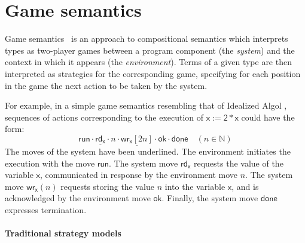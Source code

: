 \documentclass[draft,11pt]{report}
\newcommand{\kw}[1]{\ensuremath{ \mathsf{#1} }}
\begin{document}
%
%



\section{Game semantics} %



Game semantics~\cite{gsll,pcfajm,pcfho} is an approach to
compositional semantics which interprets types as two-player games
between a program component (the \emph{system}) and the context in
which it appears (the \emph{environment}).  Terms of a given type are
then interpreted as strategies for the corresponding game, specifying
for each position in the game the next action to be taken by the
system.

For example,
in a simple game semantics resembling that of
Idealized Algol \cite{gsia},
sequences of actions corresponding to
the execution of $\kw{x := 2 * x}$
could have the form:
\[
    \kw{run} \cdot
    \underline{\kw{rd}_\kw{x}} \cdot n \cdot
    \underline{\kw{wr}_\kw{x}[2n]} \cdot \kw{ok} \cdot
    \underline{\kw{done}} \quad (n \in \mathbb{N})
\]
The moves of the system have been underlined.
The environment initiates the execution with
the move $\kw{run}$.
The system move $\kw{rd}_\kw{x}$ requests
the value of the variable $\kw{x}$,
communicated in response by the environment move $n$.
The system move $\kw{wr}_\kw{x}(n)$ requests
storing the value $n$ into the variable $\kw{x}$,
and is acknowledged by the environment move $\kw{ok}$.
Finally, the system move $\kw{done}$
expresses termination.


\paragraph{Traditional strategy models} %
\end{document}
